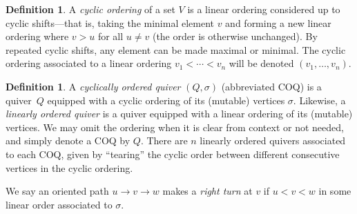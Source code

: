 \documentclass[11pt, letterpaper]{amsart}
\theoremstyle{definition}
\newtheorem{definition}[theorem]{Definition}
\numberwithin{equation}{section}
\begin{document}
\begin{definition}
\label{def:cyclic ordering}
A \emph{cyclic ordering} of a set $V$ is a linear ordering considered up to cyclic shifts---that is, taking the minimal element $v$ and forming a new linear ordering where $v > u$ for all $u \neq v$ (the order is otherwise unchanged). 
By repeated cyclic shifts, any element can be made maximal or minimal.
The cyclic ordering associated to a linear ordering $v_1 < \cdots < v_n$ will be denoted $(v_1, \ldots, v_n)$.
%
\end{definition}

\begin{definition}
\label{def:coq}
A \emph{cyclically ordered quiver} $(Q, \sigma)$ (abbreviated COQ) is a quiver~$Q$ equipped with a cyclic ordering of its (mutable) vertices $\sigma$. %
Likewise, a \emph{linearly ordered quiver} is a quiver equipped with a linear ordering of its (mutable) vertices.
We may omit the ordering when it is clear from context or not needed, and simply denote a COQ by $Q$.
There are $n$ linearly ordered quivers associated to each COQ, given by ``tearing'' the cyclic order between different consecutive vertices in the cyclic ordering.

We say an oriented path $u \rightarrow v \rightarrow w$ makes a \emph{right turn} at $v$ if $u < v < w$ in some linear order associated to $\sigma$.
\end{definition}
\end{document}
